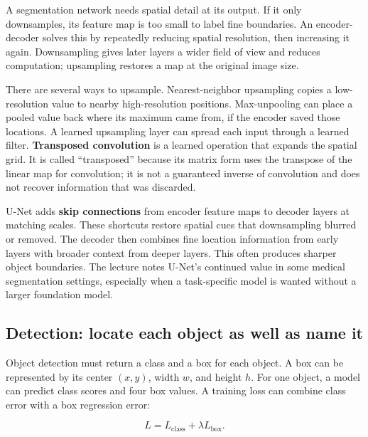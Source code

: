 \hypertarget{04-visual-computing-ii-ch031-encoder-decoder-shape-recovery-and-u-net-skips}{}

A segmentation network needs spatial detail at its output. If it only downsamples, its feature map is too small to label fine boundaries. An encoder-decoder solves this by repeatedly reducing spatial resolution, then increasing it again. Downsampling gives later layers a wider field of view and reduces computation; upsampling restores a map at the original image size.

There are several ways to upsample. Nearest-neighbor upsampling copies a low-resolution value to nearby high-resolution positions. Max-unpooling can place a pooled value back where its maximum came from, if the encoder saved those locations. A learned upsampling layer can spread each input through a learned filter. \textbf{Transposed convolution} is a learned operation that expands the spatial grid. It is called ``transposed'' because its matrix form uses the transpose of the linear map for convolution; it is not a guaranteed inverse of convolution and does not recover information that was discarded.

U-Net adds \textbf{skip connections} from encoder feature maps to decoder layers at matching scales. These shortcuts restore spatial cues that downsampling blurred or removed. The decoder then combines fine location information from early layers with broader context from deeper layers. This often produces sharper object boundaries. The lecture notes U-Net's continued value in some medical segmentation settings, especially when a task-specific model is wanted without a larger foundation model.

\subsection{Detection: locate each object as well as name it}\label{04-visual-computing-ii-ch031-detection-locate-each-object-as-well-as-name-it}

\hypertarget{04-visual-computing-ii-ch031-detection-locate-each-object-as-well-as-name-it}{}

Object detection must return a class and a box for each object. A box can be represented by its center \((x,y)\), width \(w\), and height \(h\). For one object, a model can predict class scores and four box values. A training loss can combine class error with a box regression error:

\[
L=L_{\text{class}}+\lambda L_{\text{box}}.
\]

